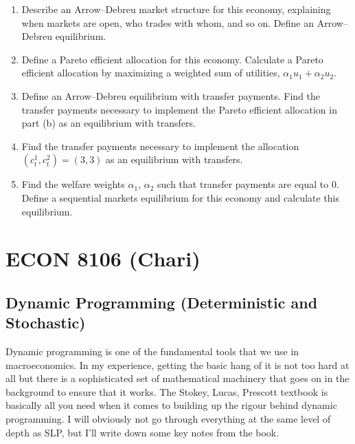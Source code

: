 \documentclass[11pt,english]{article}
\begin{document}
\begin{enumerate}
    \item[a)] Describe an Arrow--Debreu market structure for this economy,
        explaining when markets are open, who trades with whom, and so on.
        Define an Arrow--Debreu equilibrium.
    \begin{solution}
 
    \end{solution}
 
    \item[b)] Define a Pareto efficient allocation for this economy. Calculate
        a Pareto efficient allocation by maximizing a weighted sum of utilities,
        $\alpha_1 u_1 + \alpha_2 u_2$.
    \begin{solution}
 
    \end{solution}
 
    \item[c)] Define an Arrow--Debreu equilibrium with transfer payments. Find
        the transfer payments necessary to implement the Pareto efficient
        allocation in part (b) as an equilibrium with transfers.
    \begin{solution}
 
    \end{solution}
 
    \item[d)] Find the transfer payments necessary to implement the allocation
        $(c_t^1, c_t^2) = (3, 3)$ as an equilibrium with transfers.
    \begin{solution}
 
    \end{solution}
 
    \item[e)] Find the welfare weights $\alpha_1$, $\alpha_2$ such that
        transfer payments are equal to 0. Define a sequential markets
        equilibrium for this economy and calculate this equilibrium.
    \begin{solution}
 
    \end{solution}
\end{enumerate}
\section{ECON 8106 (Chari)}

\subsection{Dynamic Programming (Deterministic and Stochastic)} 
Dynamic programming is one of the fundamental tools that we use in macroeconomics. In my experience, getting the basic hang of it is not too hard at all but there is a sophisticated set of mathematical machinery that goes on in the background to ensure that it works. The Stokey, Lucas, Prescott textbook is basically all you need when it comes to building up the rigour behind dynamic programming. I will obviously not go through everything at the same level of depth as SLP, but I'll write down some key notes from the book.
\end{document}
